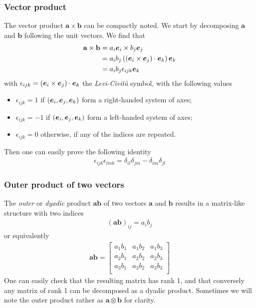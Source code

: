 \subsubsection{Vector product}

The vector product $\mathbf a \times \mathbf b$ can be compactly noted. We start by decomposing $\mathbf a$ and $\mathbf b$ following the unit vectors. We find that 
\begin{align*}
    \mathbf a \times \mathbf b &= a_i \boldsymbol e_{i} \times b_j \boldsymbol e_{j} \\
        &= a_i b_j \left(\left(\boldsymbol e_{i} \times \boldsymbol e_{j}\right) \cdot \boldsymbol e_{k}\right) \boldsymbol e_{k} \\
        &= a_i b_j \epsilon_{ijk} \boldsymbol e_{k}
\end{align*}
with $\epsilon_{ijk}=(\boldsymbol e_{i} \times \boldsymbol e_{j})\cdot \boldsymbol e_{k}$ the \emph{Levi-Civit{\`a}} symbol, with the following values
\begin{itemize}
\item $\epsilon_{ijk} = 1$ if $(\boldsymbol e_{i},\boldsymbol e_{j},\boldsymbol e_{k})$ form a
  right-handed system of axes;
\item $\epsilon_{ijk} = -1$ if $(\boldsymbol e_{i},\boldsymbol e_{j},\boldsymbol e_{k})$ form a
  left-handed system of axes;
\item $\epsilon_{ijk} = 0$ otherwise, \ie if any of the indices are repeated.
\end{itemize}
Then one can easily prove the following identity 
\begin{align*}
    \epsilon_{ijk} \epsilon_{lmk} = \delta_{il} \delta_{jm} - \delta_{im} \delta_{jl}
\end{align*}

\subsubsection{Outer product of two vectors}

The \emph{outer} or \emph{dyadic} product $\mathbf a \mathbf b$ of two
vectors $\mathbf a$ and $\mathbf b$ results in a matrix-like structure
with two indices
\begin{align*}
  (\mathbf a \mathbf b)_{ij} = a_i b_j
\end{align*}
or equivalently
\begin{align*} 
  \mathbf a \mathbf b = 
  \begin{bmatrix} 
    a_1 b_1 & a_1 b_2 & a_1 b_3 \\
    a_2 b_1 & a_2 b_2 & a_2 b_3 \\
    a_3 b_1 & a_3 b_2 & a_3 b_3 \\
  \end{bmatrix}
\end{align*}
One can easily check that the resulting matrix has rank 1, and that
conversely any matrix of rank 1 can be decomposed as a dyadic
product. Sometimes we will note the outer product rather as $\mathbf a
\otimes \mathbf b$ for clarity.

